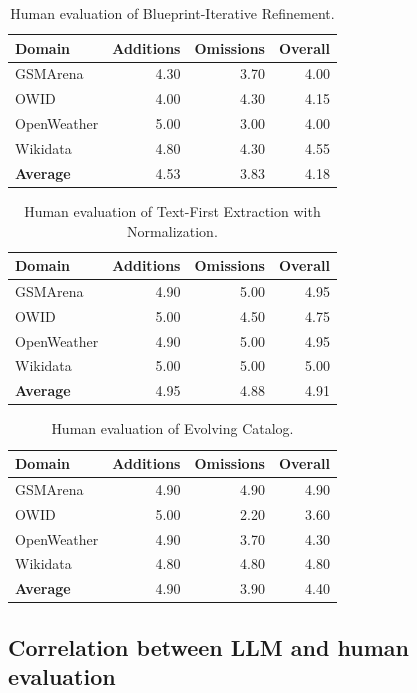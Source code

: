 \newcommand{\humantripleheader}{\textbf{Domain} & \textbf{Additions} & \textbf{Omissions} & \textbf{Overall} \\}
\begin{table}[!htbp]
\centering
\caption{Human evaluation of Blueprint-Iterative Refinement.}
\label{tab:human-blueprint-results}
\begin{tabular}{lrrr}
\hline
\humantripleheader
\hline
GSMArena & 4.30 & 3.70 & 4.00 \\
OWID & 4.00 & 4.30 & 4.15 \\
OpenWeather & 5.00 & 3.00 & 4.00 \\
Wikidata & 4.80 & 4.30 & 4.55 \\
\hline
\textbf{Average} & 4.53 & 3.83 & 4.18 \\
\hline
\end{tabular}
\end{table}

\begin{table}[!htbp]
\centering
\caption{Human evaluation of Text-First Extraction with Normalization.}
\label{tab:human-text-first-results}
\begin{tabular}{lrrr}
\hline
\humantripleheader
\hline
GSMArena & 4.90 & 5.00 & 4.95 \\
OWID & 5.00 & 4.50 & 4.75 \\
OpenWeather & 4.90 & 5.00 & 4.95 \\
Wikidata & 5.00 & 5.00 & 5.00 \\
\hline
\textbf{Average} & 4.95 & 4.88 & 4.91 \\
\hline
\end{tabular}
\end{table}

\begin{table}[!htbp]
\centering
\caption{Human evaluation of Evolving Catalog.}
\label{tab:human-catalog-results}
\begin{tabular}{lrrr}
\hline
\humantripleheader
\hline
GSMArena & 4.90 & 4.90 & 4.90 \\
OWID & 5.00 & 2.20 & 3.60 \\
OpenWeather & 4.90 & 3.70 & 4.30 \\
Wikidata & 4.80 & 4.80 & 4.80 \\
\hline
\textbf{Average} & 4.90 & 3.90 & 4.40 \\
\hline
\end{tabular}
\end{table}

\FloatBarrier
\subsection{Correlation between LLM and human evaluation}

